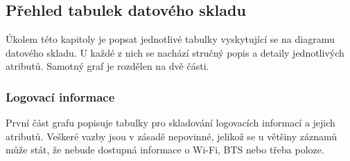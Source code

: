\documentclass[thesis=M,czech]{FITthesis}[2012/06/26]
\begin{document}
\subsection{Přehled tabulek datového skladu}
Úkolem této kapitoly je popsat jednotlivé tabulky vyskytující se na diagramu datového skladu. U každé z nich se nachází stručný popis a detaily jednotlivých atributů. Samotný graf je rozdělen na dvě části.

\subsubsection*{Logovací informace}
První část grafu popisuje tabulky pro skladování logovacích informací a jejich atributů. Veškeré vazby jsou v zásadě nepovinné, jelikož se u většiny záznamů může stát, že nebude dostupná informace o Wi-Fi, BTS nebo třeba poloze.
\end{document}
